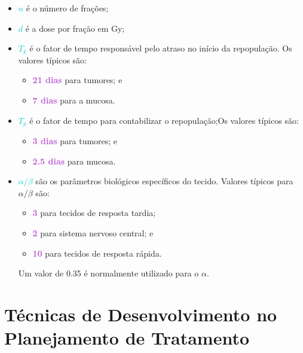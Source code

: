 \documentclass[11pt,a4paper]{article}
\newcounter{exemplo}
\begin{document}
	\begin{exemplo}[onde,]
		\begin{itemize}[label=\textcolor{CarnationPink}{$\blacksquare$}]
			\item \textcolor{DarkTurquoise}{\textbf{$n$}} é o número de frações;
			\item \textcolor{DarkTurquoise}{\textbf{$d$}} é a dose por fração em Gy;
			\item \textcolor{DarkTurquoise}{\textbf{$T_k$}} é o fator de tempo responsável pelo atraso no início da repopulação. Os valores típicos são:
				\begin{itemize}[label=\textcolor{CarnationPink}{$\star$}]
					\item \textcolor{MediumOrchid}{\textbf{21 dias}} para tumores; e
					\item \textcolor{MediumOrchid}{\textbf{7 dias}} para a mucosa.
				\end{itemize}
			\item \textcolor{DarkTurquoise}{\textbf{$T_p$}} é o fator de tempo para contabilizar o repopulação;Os valores típicos são:
				\begin{itemize}[label=\textcolor{CarnationPink}{$\star$}]
					\item \textcolor{MediumOrchid}{\textbf{3 dias}} para tumores; e
					\item \textcolor{MediumOrchid}{\textbf{2.5 dias}} para mucosa.
				\end{itemize}
			\item \textcolor{DarkTurquoise}{\textbf{$\alpha / \beta$}} são os parâmetros biológicos específicos do tecido. Valores típicos para $\alpha / \beta$ são:
				\begin{itemize}[label=\textcolor{CarnationPink}{$\star$}]
					\item \textcolor{MediumOrchid}{\textbf{3}} para tecidos de resposta tardia;
					\item \textcolor{MediumOrchid}{\textbf{2}} para sistema nervoso central; e
					\item \textcolor{MediumOrchid}{\textbf{10}} para tecidos de resposta rápida.
				\end{itemize}
			Um valor de 0.35 é normalmente utilizado para o $\alpha$.
		\end{itemize}
	\end{exemplo}
\section{Técnicas de Desenvolvimento no Planejamento de Tratamento}
\end{document}
